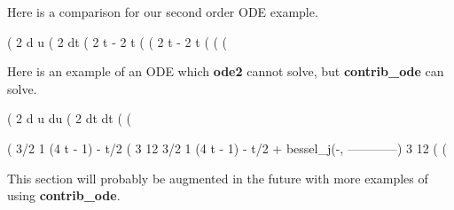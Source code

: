 \documentclass[11pt]{article}
\begin{document}
\noindent Here is a comparison for our second order ODE example.  
\begin{myVerbatim}
(%
                                    2
                                   d u
(%
                                     2
                                   dt
(%
                                    2 t         - 2 t
(%
(%
                                    2 t         - 2 t
(%
(%
(%
\end{myVerbatim}
Here is an example of an ODE which \textbf{ode2} cannot solve, but
  \textbf{contrib\_ode} can solve.
\begin{myVerbatim}
(%
                                 2
                                d u   du
(%
                                  2   dt
                                dt
(%
(%
\end{myVerbatim}
\newpage
\begin{myVerbatim}
(%
                                 3/2
                     1  (4 t - 1)                         - t/2
(%
                     3       12
                                                3/2
                                    1  (4 t - 1)                         - t/2
                         + bessel_j(-, ------------) %
                                    3       12
(%
(%
\end{myVerbatim}
This section will probably be augmented in the future with more examples of
  using \textbf{contrib\_ode}.   
\end{document}
